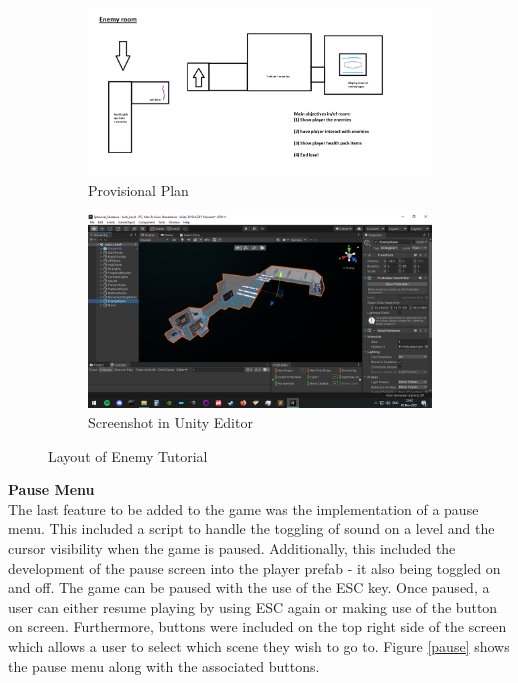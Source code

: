 \begin{figure}[H]
\centering
\begin{subfigure}{0.45\textwidth}
  \centering
  \includegraphics[width=1\linewidth]{Figures/enemyplan.png}
  \caption{Provisional Plan}
\end{subfigure}%
\begin{subfigure}{0.45\textwidth}
  \centering
  \includegraphics[width=1\linewidth]{Figures/enemy.png}
  \caption{Screenshot in Unity Editor}
\end{subfigure}
\caption{Layout of Enemy Tutorial}
\label{enemy}
\end{figure}

\noindent \textbf{Pause Menu}\\
The last feature to be added to the game was the implementation of a pause menu. This included a script to handle the toggling of sound on a level and the cursor visibility when the game is paused. Additionally, this included the development of the pause screen into the player prefab - it also being toggled on and off. The game can be paused with the use of the ESC key. Once paused, a user can either resume playing by using ESC again or making use of the button on screen. Furthermore, buttons were included on the top right side of the screen which allows a user to select which scene they wish to go to. Figure \ref{pause} shows the pause menu along with the associated buttons.

